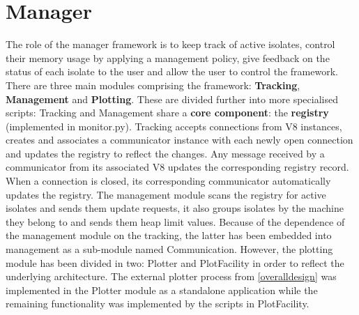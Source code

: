 \documentclass{l4proj}
\begin{document}
\section{Manager}
\hspace*{3em} The role of the manager framework is to keep track of active isolates, control their memory usage by applying a management policy, give feedback on the status of each isolate to the user and allow the user to control the framework. There are three main modules comprising the framework: \textbf{Tracking}, \textbf{Management} and \textbf{Plotting}. These are divided further into more specialised scripts:
\hspace*{3em} Tracking and Management share a \textbf{core component}: the \textbf{registry} (implemented in monitor.py). Tracking accepts connections from V8 instances, creates and associates a communicator instance with each newly open connection and updates the registry to reflect the changes. Any message received by a communicator from its associated V8 updates the corresponding registry record. When a connection is closed, its corresponding communicator automatically updates the registry. The management module scans the registry for active isolates and sends them update requests, it also groups isolates by the machine they belong to and sends them heap limit values. Because of the dependence of the management module on the tracking, the latter has been embedded into management as a sub-module named Communication. However, the plotting module has been divided in two: Plotter and PlotFacility in order to reflect the underlying architecture. The external plotter process from \cref{overalldesign} was implemented in the Plotter module as a standalone application while the remaining functionality was implemented by the scripts in PlotFacility. 
\end{document}

